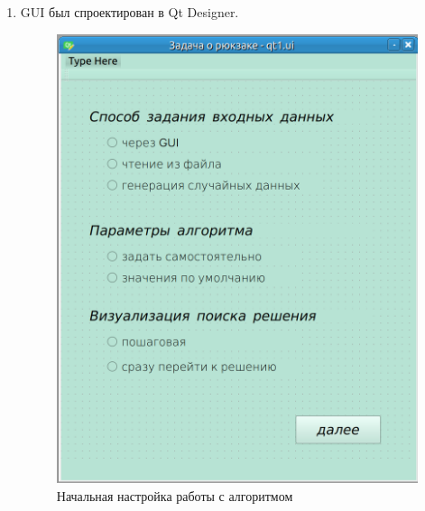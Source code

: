 \documentclass{article}
\begin{document}
\begin{enumerate}
\item GUI был спроектирован в Qt Designer. 

\begin{figure}[h!]
\centering
\includegraphics[width=0.5\linewidth]{images/qt1.png}
\caption{Начальная настройка работы с алгоритмом}
\label{fig:mpr}
\end{figure}


\end{enumerate}
\end{document}
